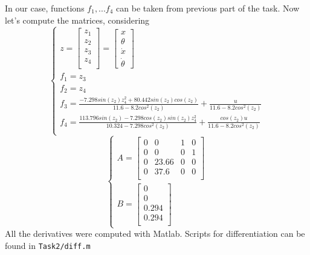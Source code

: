 \documentclass[a4paper,12pt]{article}
\begin{document}
    In our case, functions $f_1, ... f_4$ can be taken from previous part of the
    task. Now let's compute the matrices, considering
    \begin{equation}
        \begin{cases}
        z = 
        \begin{bmatrix}
            z_1\\
            z_2\\
            z_3\\
            z_4\\
        \end{bmatrix} = 
        \begin{bmatrix}
            x\\
            \theta\\
            \dot x\\
            \dot \theta    
        \end{bmatrix}\\
        f_1 = z_3\\
        f_2 = z_4\\
        f_3 = \frac
        {- 7.298sin(z_2)z_4^2 + 80.442sin(z_2)cos(z_2)}
        {11.6 - 8.2cos^2(z_2)}
        +
        \frac{u}
        {11.6 - 8.2cos^2(z_2)}
        \\
        f_4 = \frac
        {113.796sin(z_2) - 7.298cos(z_2)sin(z_2)z_4^2}
        {10.324 - 7.298cos^2(z_2)}
        +
        \frac{cos(z_2)u}
        {11.6 - 8.2cos^2(z_2)}\\
        \end{cases}
    \end{equation}
    \begin{equation}\label{linearized}
        \begin{cases}
            A=
            \begin{bmatrix}
                0 & 0 & 1 & 0 \\
                0 & 0 & 0 & 1 \\
                0 & 23.66 & 0 & 0\\
                0 & 37.6  & 0 & 0\\
            \end{bmatrix}\\
            B=
            \begin{bmatrix}
                0 \\
                0 \\
                0.294 \\
                0.294 \\
            \end{bmatrix}
        \end{cases}
    \end{equation}
    All the derivatives were computed with Matlab.
    Scripts for differentiation can be found in \texttt{Task2/diff.m}
\end{document}
